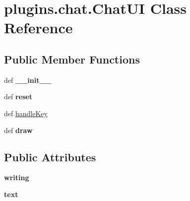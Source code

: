 \hypertarget{classplugins_1_1chat_1_1_chat_u_i}{\section{plugins.\-chat.\-Chat\-U\-I \-Class \-Reference}
\label{classplugins_1_1chat_1_1_chat_u_i}
}
\subsection*{\-Public \-Member \-Functions}
\begin{DoxyCompactItemize}
\item 
\hypertarget{classplugins_1_1chat_1_1_chat_u_i_a185f8f51e02a963b31b9b8927d973cab}{def {\bfseries \-\_\-\-\_\-init\-\_\-\-\_\-}}\label{classplugins_1_1chat_1_1_chat_u_i_a185f8f51e02a963b31b9b8927d973cab}

\item 
\hypertarget{classplugins_1_1chat_1_1_chat_u_i_a3214d4b0cb1ca2ecc14b9f20557831b5}{def {\bfseries reset}}\label{classplugins_1_1chat_1_1_chat_u_i_a3214d4b0cb1ca2ecc14b9f20557831b5}

\item 
def \hyperlink{classplugins_1_1chat_1_1_chat_u_i_a8ca26e03589001781eaf635977f8eed5}{handle\-Key}
\item 
\hypertarget{classplugins_1_1chat_1_1_chat_u_i_a6e95815ced02bbfce6bfec3964784368}{def {\bfseries draw}}\label{classplugins_1_1chat_1_1_chat_u_i_a6e95815ced02bbfce6bfec3964784368}

\end{DoxyCompactItemize}
\subsection*{\-Public \-Attributes}
\begin{DoxyCompactItemize}
\item 
\hypertarget{classplugins_1_1chat_1_1_chat_u_i_ae122f51127a1147db7778671275b0f63}{{\bfseries writing}}\label{classplugins_1_1chat_1_1_chat_u_i_ae122f51127a1147db7778671275b0f63}

\item 
\hypertarget{classplugins_1_1chat_1_1_chat_u_i_a96505c72247f990f688350d86f185b97}{{\bfseries text}}\label{classplugins_1_1chat_1_1_chat_u_i_a96505c72247f990f688350d86f185b97}

\end{DoxyCompactItemize}
